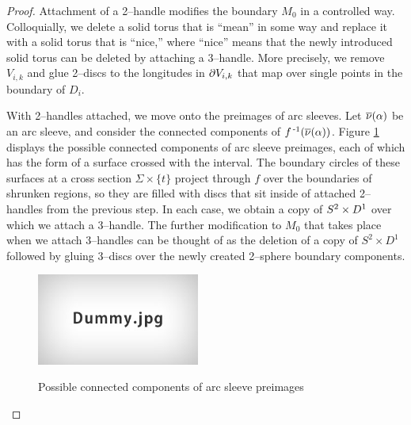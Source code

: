 \begin{proof}
	Attachment of a 2--handle modifies the boundary $M_0$ in a controlled way.
	Colloquially, we delete a solid torus that is ``mean'' in some way and replace it with a solid torus that is ``nice,'' where ``nice'' means that the newly introduced solid torus can be deleted by attaching a 3--handle.
	More precisely, we remove $V_{i,k}$ and glue 2--discs to the longitudes in $\partial V_{i,k}$ that map over single points in the boundary of $D_i$.
		
	With 2--handles attached, we move onto the preimages of arc sleeves.
	Let $\overline{\nu}(\alpha)$ be an arc sleeve, and consider the connected components of $f^{\,\text{-}1}(\overline{\nu}(\alpha))$.
	Figure \ref{fig:arcsleevepre} displays the possible connected components of arc sleeve preimages, each of which has the form of a surface crossed with the interval.
	The boundary circles of these surfaces at a cross section $\Sigma\times\{t\}$ project through $f$ over the boundaries of shrunken regions, so they are filled with discs that sit inside of attached 2--handles from the previous step.
	In each case, we obtain a copy of $S^2\times D^1$ over which we attach a 3--handle.
	The further modification to $M_0$ that takes place when we attach 3--handles can be thought of as the deletion of a copy of $S^2\times D^1$ followed by gluing 3--discs over the newly created 2--sphere boundary components.
	
	\begin{figure}
		\centering
		\captionsetup{justification=centering}
		\caption{Possible connected components of arc sleeve preimages}
		\includegraphics[height=3cm]{figures/dummy.jpg}
		\label{fig:arcsleevepre}
	\end{figure}
	

\end{proof}
